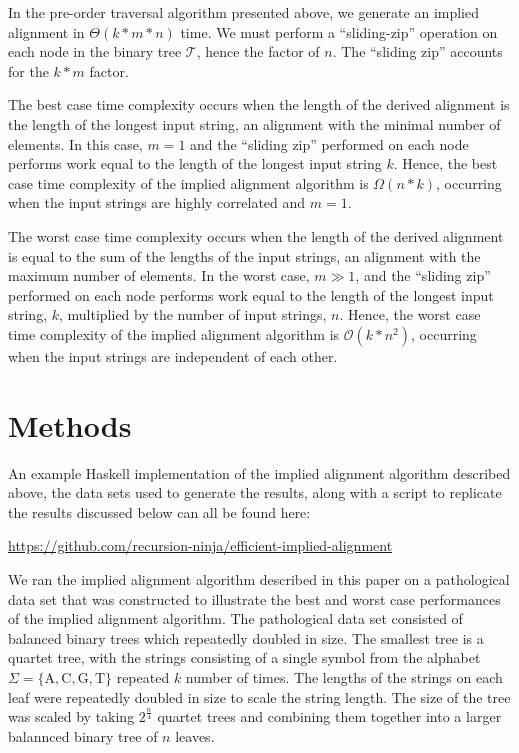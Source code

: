 \documentclass{bmcart}
\begin{document}
In the pre-order traversal algorithm presented above, we generate an implied alignment in $\Theta(k * m * n)$ time.
We must perform a ``sliding-zip'' operation on each node in the binary tree $\mathcal{T}$, hence the factor of $n$.
The ``sliding zip'' accounts for the $k * m$ factor.

The best case time complexity occurs when the length of the derived alignment is the length of the longest input string, an alignment with the minimal number of elements.
In this case, $m = 1$ and the ``sliding zip'' performed on each node performs work equal to the length of the longest input string $k$.
Hence, the best case time complexity of the implied alignment algorithm is $\Omega(n*k)$, occurring when the input strings are highly correlated and $m = 1$.

The worst case time complexity occurs when the length of the derived alignment is equal to the sum of the lengths of the input strings, an alignment with the maximum number of elements.
In the worst case, $m \gg 1$, and the ``sliding zip'' performed on each node performs work equal to the length of the longest input string, $k$, multiplied by the number of input strings, $n$.
Hence, the worst case time complexity of the implied alignment algorithm is $\mathcal{O}(k * n^2)$, occurring when the input strings are independent of each other.


\section*{Methods}

An example Haskell implementation of the implied alignment algorithm described above, the data sets used to generate the results, along with a script to replicate the results discussed below can all be found here: 

\centerline{\url{https://github.com/recursion-ninja/efficient-implied-alignment}}

We ran the implied alignment algorithm described in this paper on a pathological data set that was constructed to illustrate the best and worst case performances of the implied alignment algorithm.
The pathological data set consisted of balanced binary trees which repeatedly doubled in size.
The smallest tree is a quartet tree, with the strings consisting of a single symbol from the alphabet $\Sigma = \{\mathrm{A, C, G, T}\}$ repeated $k$ number of times.
The lengths of the strings on each leaf were repeatedly doubled in size to scale the string length.
The size of the tree was scaled by taking $2^{\frac{n}{4}}$ quartet trees and combining them together into a larger balannced binary tree of $n$ leaves.
\end{document}

